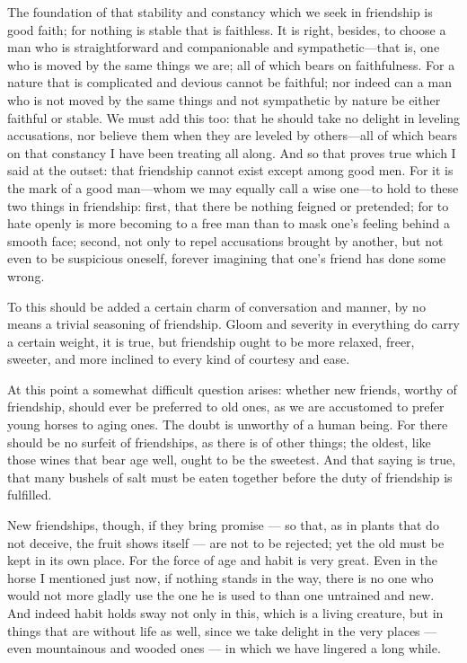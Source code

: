  The foundation of that stability and constancy which we seek in friendship is good faith; for nothing is stable that is faithless. It is right, besides, to choose a man who is straightforward and companionable and sympathetic—that is, one who is moved by the same things we are; all of which bears on faithfulness. For a nature that is complicated and devious cannot be faithful; nor indeed can a man who is not moved by the same things and not sympathetic by nature be either faithful or stable. We must add this too: that he should take no delight in leveling accusations, nor believe them when they are leveled by others—all of which bears on that constancy I have been treating all along. And so that proves true which I said at the outset: that friendship cannot exist except among good men. For it is the mark of a good man—whom we may equally call a wise one—to hold to these two things in friendship: first, that there be nothing feigned or pretended; for to hate openly is more becoming to a free man than to mask one's feeling behind a smooth face; second, not only to repel accusations brought by another, but not even to be suspicious oneself, forever imagining that one's friend has done some wrong.

 To this should be added a certain charm of conversation and manner, by no means a trivial seasoning of friendship. Gloom and severity in everything do carry a certain weight, it is true, but friendship ought to be more relaxed, freer, sweeter, and more inclined to every kind of courtesy and ease.

 At this point a somewhat difficult question arises: whether new friends, worthy of friendship, should ever be preferred to old ones, as we are accustomed to prefer young horses to aging ones. The doubt is unworthy of a human being. For there should be no surfeit of friendships, as there is of other things; the oldest, like those wines that bear age well, ought to be the sweetest. And that saying is true, that many bushels of salt must be eaten together before the duty of friendship is fulfilled.

 New friendships, though, if they bring promise — so that, as in plants that do not deceive, the fruit shows itself — are not to be rejected; yet the old must be kept in its own place. For the force of age and habit is very great. Even in the horse I mentioned just now, if nothing stands in the way, there is no one who would not more gladly use the one he is used to than one untrained and new. And indeed habit holds sway not only in this, which is a living creature, but in things that are without life as well, since we take delight in the very places — even mountainous and wooded ones — in which we have lingered a long while.

